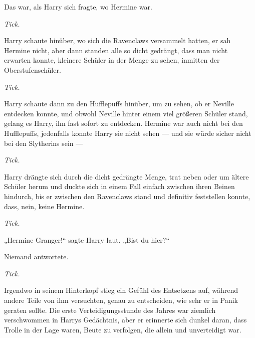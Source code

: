 Das war, als Harry sich fragte, wo Hermine war.

\emph{Tick.}

Harry schaute hinüber, wo sich die Ravenclaws versammelt hatten, er sah Hermine nicht, aber dann standen alle so dicht gedrängt, dass man nicht erwarten konnte, kleinere Schüler in der Menge zu sehen, inmitten der Oberstufenschüler.

\emph{Tick.}

Harry schaute dann zu den Hufflepuffs hinüber, um zu sehen, ob er Neville entdecken konnte, und obwohl Neville hinter einem viel größeren Schüler stand, gelang es Harry, ihn fast sofort zu entdecken. Hermine war auch nicht bei den Hufflepuffs, jedenfalls konnte Harry sie nicht sehen — und sie würde sicher nicht bei den Slytherins sein —

\emph{Tick.}

Harry drängte sich durch die dicht gedrängte Menge, trat neben oder um ältere Schüler herum und duckte sich in einem Fall einfach zwischen ihren Beinen hindurch, bis er zwischen den Ravenclaws stand und definitiv feststellen konnte, dass, nein, keine Hermine.

\emph{Tick.}

„Hermine Granger!“ sagte Harry laut.
„Bist du hier?“

Niemand antwortete.

\emph{Tick.}

Irgendwo in seinem Hinterkopf stieg ein Gefühl des Entsetzens auf, während andere Teile von ihm versuchten, genau zu entscheiden, wie sehr er in Panik geraten sollte. Die erste Verteidigungsstunde des Jahres war ziemlich verschwommen in Harrys Gedächtnis, aber er erinnerte sich dunkel daran, dass Trolle in der Lage waren, Beute zu verfolgen, die allein und unverteidigt war.

